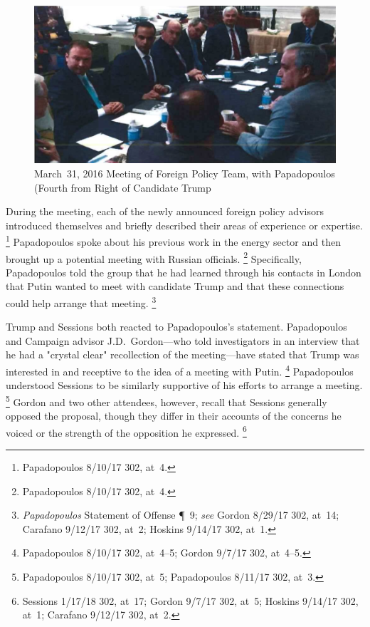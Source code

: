 \begin{figure}[t]
    \vspace{-20pt}
    \begin{center}
        \includegraphics[width=5in]{images/p-86-foreign-policy-team.png}%
    \end{center}
    \vspace{-20pt}
    \caption*{March~31, 2016 Meeting of Foreign Policy Team, with Papadopoulos (Fourth from Right of Candidate Trump}
    \vspace{-10pt}
    \label{fig:foreign-policy-team}
\end{figure}

During the meeting, each of the newly announced foreign policy advisors introduced themselves and briefly described their areas of experience or expertise.%
\footnote{Papadopoulos 8/10/17 302, at~4.}
Papadopoulos spoke about his previous work in the energy sector and then brought up a potential meeting with Russian officials.%
\footnote{Papadopoulos 8/10/17 302, at~4.}
Specifically, Papadopoulos told the group that he had learned through his contacts in London that Putin wanted to meet with candidate Trump and that these connections could help arrange that meeting.%
\footnote{\textit{Papadopoulos} Statement of Offense \P~9; \textit{see} Gordon 8/29/17 302, at~14; Carafano 9/12/17 302, at~2; Hoskins 9/14/17 302, at~1.}

Trump and Sessions both reacted to Papadopoulos's statement. Papadopoulos and Campaign advisor J.D.~Gordon---who told investigators in an interview that he had a "crystal clear" recollection of the meeting---have stated that Trump was interested in and receptive to the idea of a meeting with Putin.%
\footnote{Papadopoulos 8/10/17 302, at~4--5; Gordon 9/7/17 302, at~4--5.}
Papadopoulos understood Sessions to be similarly supportive of his efforts to arrange a meeting.%
\footnote{Papadopoulos 8/10/17 302, at~5; Papadopoulos 8/11/17 302, at~3.}
Gordon and two other attendees, however, recall that Sessions generally opposed the proposal, though they differ in their accounts of the concerns he voiced or the strength of the opposition he expressed.%
\footnote{Sessions 1/17/18 302, at~17; Gordon 9/7/17 302, at~5; Hoskins 9/14/17 302, at~1; Carafano 9/12/17 302, at~2.}

